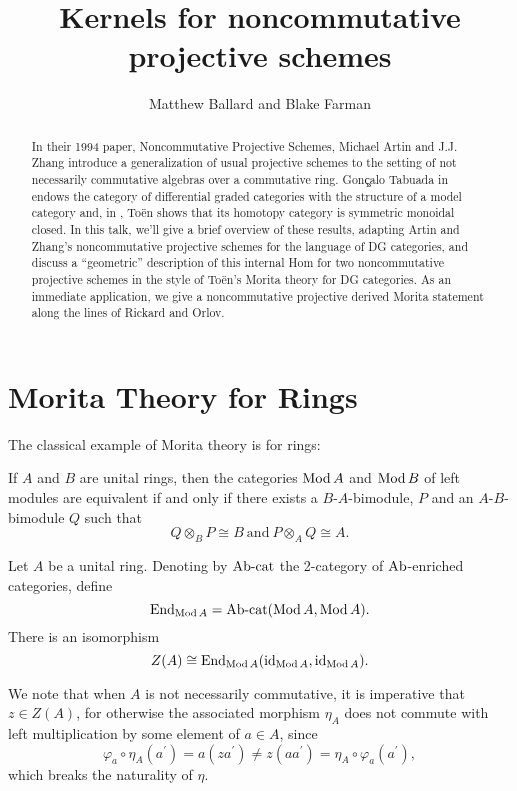 \documentclass[reqno, 12pt]{amsart}
\title[Noncommutative kernels]{Kernels for noncommutative projective schemes}
\author{Matthew Ballard and Blake Farman}
\begin{document}
\begin{abstract}
  In their 1994 paper, Noncommutative Projective Schemes, Michael Artin and J.J. Zhang introduce a generalization of usual projective schemes to the setting of not necessarily commutative algebras over a commutative ring. Gon\c{ç}alo Tabuada in \cite{Tab05} endows the category of differential graded categories with the structure of a model category and, in \cite{Toen}, Toën shows that its homotopy category is symmetric monoidal closed. In this talk, we’ll give a brief overview of these results, adapting Artin and Zhang’s noncommutative projective schemes for the language of DG categories, and discuss a “geometric” description of this internal Hom for two noncommutative projective schemes in the style of To\"en's Morita theory for DG categories.
  As an immediate application, we give a noncommutative projective derived Morita statement along the lines of Rickard and Orlov.
\end{abstract}

\maketitle

\section{Morita Theory  for Rings} \label{section: Morita for Rings}
The classical example of Morita theory is for rings:

\begin{theorem}\label{thm: Morita}
  If $A$ and $B$ are unital rings, then the categories $\operatorname{Mod}A$ and $\operatorname{Mod}B$ of left modules are equivalent if and only if there exists a $B$-$A$-bimodule, $P$ and an $A$-$B$-bimodule $Q$ such that
  $$Q \otimes_B P \cong B\ \text{and}\ P \otimes_A Q \cong A.$$
\end{theorem}

\begin{lemma}\label{lem: endomorphisms of identity functor are the center}
  Let $A$ be a unital ring.
  Denoting by $\operatorname{Ab-cat}$ the 2-category of \newline$\operatorname{Ab}$-enriched categories, define 
  $$\operatorname{End}_{\operatorname{Mod}A} = \operatorname{Ab-cat}(\operatorname{Mod}A,\operatorname{Mod}A).$$
There is an isomorphism
$$Z(A) \cong \operatorname{End}_{\operatorname{Mod}A}(\operatorname{id}_{\operatorname{Mod}A}, \operatorname{id}_{\operatorname{Mod}A}).$$
\end{lemma}

\begin{remark}
  We note that when $A$ is not necessarily commutative, it is imperative that $z \in Z(A)$, for otherwise the associated morphism $\eta_A$ does not commute with left multiplication by some element of $a \in A$, since
  $$\varphi_a \circ \eta_A(a^\prime) = a(za^\prime) \neq z(aa^\prime) = \eta_A \circ \varphi_a(a^\prime),$$
  which breaks the naturality of $\eta$.
\end{remark}
\end{document}
